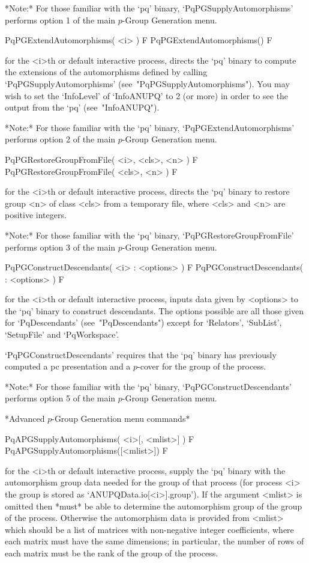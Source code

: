 *Note:*
For  those  familiar  with  the  `pq'  binary,  `PqPGSupplyAutomorphisms'
performs option 1 of the main $p$-Group Generation menu.

\>PqPGExtendAutomorphisms( <i> ) F
\>PqPGExtendAutomorphisms() F

for the <i>th or default interactive {\ANUPQ} process, directs  the  `pq'
binary to compute the extensions of the automorphisms defined by  calling
`PqPGSupplyAutomorphisms' (see~"PqPGSupplyAutomorphisms"). You  may  wish
to set the `InfoLevel' of `InfoANUPQ' to 2 (or more) in order to see  the
output from the `pq' (see~"InfoANUPQ").

*Note:*    
For  those  familiar  with  the  `pq'  binary,  `PqPGExtendAutomorphisms'
performs option 2 of the main $p$-Group Generation menu. 

\>PqPGRestoreGroupFromFile( <i>, <cls>, <n> ) F
\>PqPGRestoreGroupFromFile( <cls>, <n> ) F

for the <i>th or default interactive {\ANUPQ} process, directs  the  `pq'
binary to restore group <n> of class <cls> from a temporary  file,  where
<cls> and <n> are positive integers.

*Note:* 
For those  familiar  with  the  `pq'  binary,  `PqPGRestoreGroupFromFile'
performs option 3 of the main $p$-Group Generation menu.

\>PqPGConstructDescendants( <i> : <options> ) F
\>PqPGConstructDescendants( : <options> ) F

for the <i>th or default interactive {\ANUPQ} process, inputs data  given
by <options> to the `pq' binary to  construct  descendants.  The  options
possible are all those given  for  `PqDescendants'  (see~"PqDescendants")
except for `Relators', `SubList', `SetupFile' and `PqWorkspace'.

`PqPGConstructDescendants' requires that the `pq' binary  has  previously
computed a pc presentation and a $p$-cover for the group of the process.

*Note:* 
For those  familiar  with  the  `pq'  binary,  `PqPGConstructDescendants'
performs option 5 of the main $p$-Group Generation menu.

*Advanced $p$-Group Generation menu commands*

\>PqAPGSupplyAutomorphisms( <i>[, <mlist>] ) F
\>PqAPGSupplyAutomorphisms([<mlist>]) F

for the <i>th or default interactive {\ANUPQ} process,  supply  the  `pq'
binary with the automorphism group data needed  for  the  group  of  that
process    (for    process    <i>    the    group    is     stored     as
`ANUPQData.io[<i>].group'). If  the  argument  <mlist>  is  omitted  then
{\GAP} *must* be able to determine the automorphism group of the group of
the process. Otherwise the automorphism data  is  provided  from  <mlist>
which  should  be  a  list  of   matrices   with   non-negative   integer
coefficients, where  each  matrix  must  have  the  same  dimensions;  in
particular, the number of rows of each matrix must be  the  rank  of  the
group of the process.

